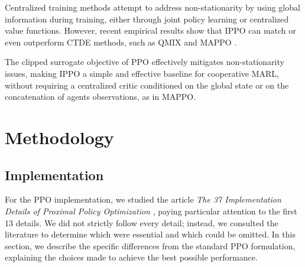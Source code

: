 \documentclass{article}
\begin{document}
Centralized training methods attempt to address non-stationarity by using
global information during training, either through joint policy learning or
centralized value functions. However, recent empirical results show that IPPO
can match or even outperform CTDE methods, such as QMIX and MAPPO
\cite{dewitt2020independentlearningneedstarcraft,
yu2022surprisingeffectivenessppocooperative}.

The clipped surrogate objective of PPO effectively mitigates non-stationarity
issues, making IPPO a simple and effective baseline for cooperative MARL,
without requiring a centralized critic conditioned on the global state or on
the concatenation of agents observations, as in MAPPO.

\section{Methodology}

\subsection{Implementation}

For the PPO implementation, we studied the article \textit{The 37
Implementation Details of Proximal Policy Optimization} \cite{huang2022ppo},
paying particular attention to the first 13 details. We did not strictly
follow every detail; instead, we consulted the literature to determine which
were essential and which could be omitted. In this section, we describe the
specific differences from the standard PPO formulation, explaining the choices
made to achieve the best possible performance.
\end{document}
